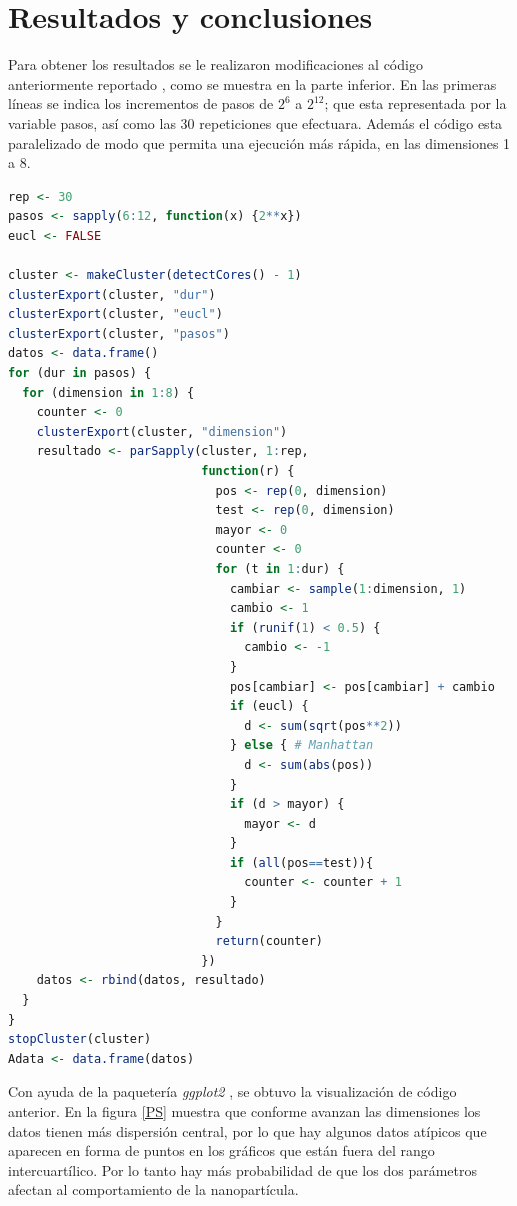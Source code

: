 \documentclass[12pt, letterpaper] {article}
\begin{document}
\section{Resultados y conclusiones}

Para obtener los resultados se le realizaron modificaciones al código anteriormente reportado \cite{AsP1}\cite{MPP1}, como se muestra en la parte inferior. En las primeras líneas se indica los incrementos de pasos de $2^6$ a $2^{12}$; que esta representada por la variable pasos, así como  las 30 repeticiones que efectuara. Además el código esta paralelizado de modo que permita una ejecución más rápida, en las dimensiones 1 a 8. 


\begin{lstlisting}[language=R]
rep <- 30
pasos <- sapply(6:12, function(x) {2**x})
eucl <- FALSE

cluster <- makeCluster(detectCores() - 1)
clusterExport(cluster, "dur")
clusterExport(cluster, "eucl")
clusterExport(cluster, "pasos")
datos <- data.frame()
for (dur in pasos) {
  for (dimension in 1:8) {
    counter <- 0
    clusterExport(cluster, "dimension")
    resultado <- parSapply(cluster, 1:rep,
                           function(r) {
                             pos <- rep(0, dimension)
                             test <- rep(0, dimension)
                             mayor <- 0
                             counter <- 0
                             for (t in 1:dur) {
                               cambiar <- sample(1:dimension, 1)
                               cambio <- 1
                               if (runif(1) < 0.5) {
                                 cambio <- -1
                               }
                               pos[cambiar] <- pos[cambiar] + cambio
                               if (eucl) {
                                 d <- sum(sqrt(pos**2))
                               } else { # Manhattan
                                 d <- sum(abs(pos))
                               }
                               if (d > mayor) {
                                 mayor <- d
                               }
                               if (all(pos==test)){
                                 counter <- counter + 1
                               } 
                             }
                             return(counter)
                           })
    datos <- rbind(datos, resultado)
  }
}
stopCluster(cluster)
Adata <- data.frame(datos) 
\end{lstlisting}

Con ayuda de la paquetería \textit{ggplot2} \cite{Bxplot}\cite{BPlot}, se obtuvo la visualización de código anterior. En la figura \ref{PS} muestra que conforme avanzan las dimensiones los datos tienen más dispersión central, por lo que hay algunos datos atípicos que aparecen en forma de puntos en los gráficos que están fuera del rango intercuartílico. Por lo tanto hay más probabilidad de que los dos parámetros afectan al comportamiento de la nanopartícula.
\end{document}
